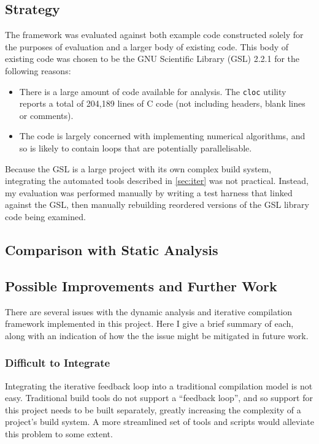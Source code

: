 \documentclass[journal]{IEEEtran}
\begin{document}
\subsection{Strategy}

The framework was evaluated against both example code constructed solely for the
purposes of evaluation and a larger body of existing code. This body of existing
code was chosen to be the GNU Scientific Library (GSL) 2.2.1
\cite{gough_gnu_2009} for the following reasons:

\begin{itemize}
  \item There is a large amount of code available for analysis. The
    \texttt{cloc} utility \cite{_aldanial/cloc_????} reports a total of 204,189
    lines of C code (not including headers, blank lines or comments).
  \item The code is largely concerned with implementing numerical algorithms,
    and so is likely to contain loops that are potentially parallelisable.
\end{itemize}

Because the GSL is a large project with its own complex build system,
integrating the automated tools described in \autoref{sec:iter} was not
practical. Instead, my evaluation was performed manually by writing a test
harness that linked against the GSL, then manually rebuilding reordered versions
of the GSL library code being examined.

\subsection{Comparison with Static Analysis} \label{ssec:compare}

\subsection{Possible Improvements and Further Work}

There are several issues with the dynamic analysis and iterative compilation
framework implemented in this project. Here I give a brief summary of each,
along with an indication of how the the issue might be mitigated in future work.

\subsubsection{Difficult to Integrate}

Integrating the iterative feedback loop into a traditional compilation model is
not easy. Traditional build tools do not support a ``feedback loop'', and so
support for this project needs to be built separately, greatly increasing the
complexity of a project's build system. A more streamlined set of tools and
scripts would alleviate this problem to some extent.
\end{document}
